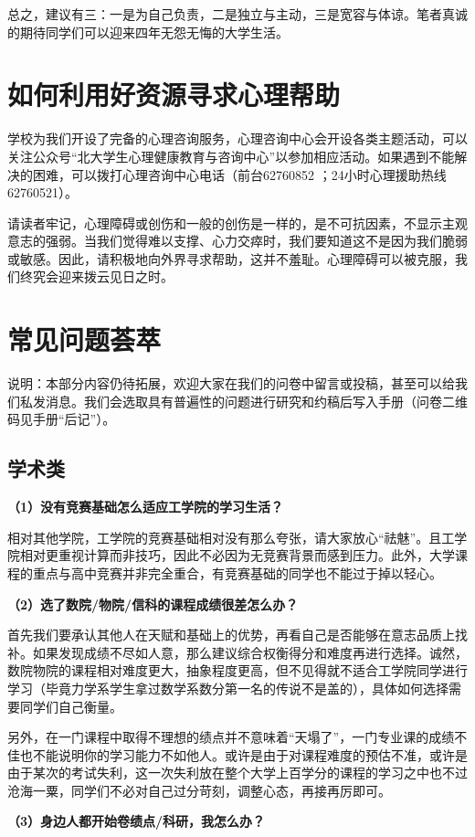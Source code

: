 \documentclass[11pt,oneside]{book}
\begin{document}
总之，建议有三：一是为自己负责，二是独立与主动，三是宽容与体谅。笔者真诚的期待同学们可以迎来四年无怨无悔的大学生活。

\section{如何利用好资源寻求心理帮助}
学校为我们开设了完备的心理咨询服务，心理咨询中心会开设各类主题活动，可以关注公众号“北大学生心理健康教育与咨询中心”以参加相应活动。如果遇到不能解决的困难，可以拨打心理咨询中心电话（前台62760852 ；24小时心理援助热线62760521）。

请读者牢记，心理障碍或创伤和一般的创伤是一样的，是不可抗因素，不显示主观意志的强弱。当我们觉得难以支撑、心力交瘁时，我们要知道这不是因为我们脆弱或敏感。因此，请积极地向外界寻求帮助，这并不羞耻。心理障碍可以被克服，我们终究会迎来拨云见日之时。

\section{常见问题荟萃}
说明：本部分内容仍待拓展，欢迎大家在我们的问卷中留言或投稿，甚至可以给我们私发消息。我们会选取具有普遍性的问题进行研究和约稿后写入手册（问卷二维码见手册“后记”）。
\subsection{学术类}
\textbf{（1）没有竞赛基础怎么适应工学院的学习生活？}

相对其他学院，工学院的竞赛基础相对没有那么夸张，请大家放心“祛魅”。且工学院相对更重视计算而非技巧，因此不必因为无竞赛背景而感到压力。此外，大学课程的重点与高中竞赛并非完全重合，有竞赛基础的同学也不能过于掉以轻心。

\textbf{（2）选了数院/物院/信科的课程成绩很差怎么办？}

首先我们要承认其他人在天赋和基础上的优势，再看自己是否能够在意志品质上找补。如果发现成绩不尽如人意，那么建议综合权衡得分和难度再进行选择。诚然，数院物院的课程相对难度更大，抽象程度更高，但不见得就不适合工学院同学进行学习（毕竟力学系学生拿过数学系数分第一名的传说不是盖的），具体如何选择需要同学们自己衡量。

另外，在一门课程中取得不理想的绩点并不意味着“天塌了”，一门专业课的成绩不佳也不能说明你的学习能力不如他人。或许是由于对课程难度的预估不准，或许是由于某次的考试失利，这一次失利放在整个大学上百学分的课程的学习之中也不过沧海一粟，同学们不必对自己过分苛刻，调整心态，再接再厉即可。

\textbf{（3）身边人都开始卷绩点/科研，我怎么办？}
\end{document}
